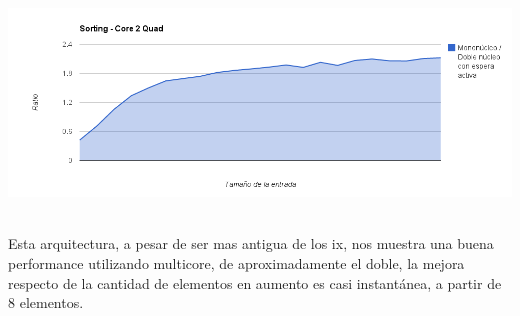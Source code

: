 	\begin{center}
	    \includegraphics[height=6cm]{images/core2quad_sorting.png}
	\end{center}

	Esta arquitectura, a pesar de ser mas antigua de los ix, nos muestra una buena performance utilizando multicore, de aproximadamente el doble, la mejora respecto de la cantidad de elementos en aumento es casi instantánea, a partir de 8 elementos.

